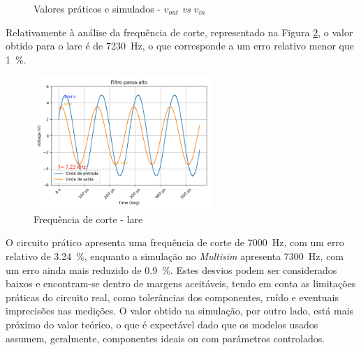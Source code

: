 \begin{figure}[hbtp]
	\centering%
		\centering
		\qquad
		\caption{Valores práticos e simulados - $v_{out}$ \textit{vs} $v_{in}$}%
		\label{fig:simulacaoPA}%
	\end{figure}

Relativamente à análise da frequência de corte, representado na Figura \ref{fig:fcvoutlare}, o valor obtido para o \acrshort{lare} é de \SI{7230}{\hertz}, o que corresponde a um erro relativo menor que \SI{1}{\percent}.

\begin{figure}[hbtp]
	\centering
	\includegraphics[width=0.6\textwidth]{figures/filtro_passa-alto_fc_LaRE.png}
	\caption{Frequência de corte - \acrshort{lare}}
	\label{fig:fcvoutlare}
\end{figure}

O circuito prático apresenta uma frequência de corte de \SI{7000}{\hertz}, com um erro relativo de \SI{3.24}{\percent}, enquanto a simulação no \textit{Multisim} apresenta \SI{7300}{\hertz}, com um erro ainda mais reduzido de \SI{0.9}{\percent}. Estes desvios podem ser considerados baixos e encontram-se dentro de margens aceitáveis, tendo em conta as limitações práticas do circuito real, como tolerâncias dos componentes, ruído e eventuais imprecisões nas medições. O valor obtido na simulação, por outro lado, está mais próximo do valor teórico, o que é expectável dado que os modelos usados assumem, geralmente, componentes ideais ou com parâmetros controlados.

